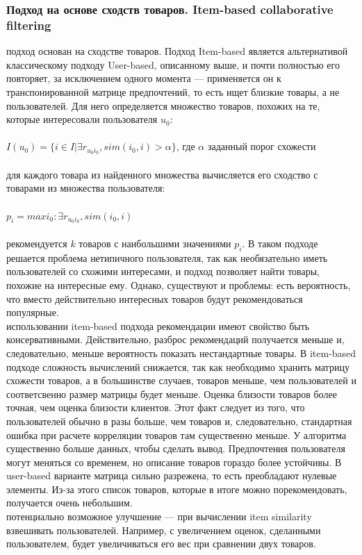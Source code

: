 \documentclass{article}
\newcommand\tab[1][1cm]{\hspace*{#1}}
\begin{document}
\subsubsection{Подход на основе сходств товаров. Item-based collaborative filtering}
 подход основан на сходстве товаров. Подход Item-based является альтернативой классическому подходу User-based, описанному выше, и почти полностью его повторяет, за исключением одного момента — применяется он к транспонированной матрице предпочтений, то есть ищет близкие товары, а не пользователей. Для него определяется множество товаров, похожих на те, которые интересовали пользователя ﻿$u_0$:\\
\\
\tab$I(u_0)=\{i\in I|\exists r_{u_0i_0}, sim(i_0,i)>\alpha \}$, где ﻿$\alpha$ заданный порог схожести\\
\\
 для каждого товара из найденного множества вычисляется его сходство с товарами из множества пользователя:\\
\\
\tab$p_i=max i_0: \exists r_{u_0i_0},sim(i_0,i)$\\
\\
 рекомендуется ﻿$k$ товаров с наибольшими значениями $p_i$﻿. В таком подходе решается проблема нетипичного пользователя, так как необязательно иметь пользователей со схожими интересами, и подход позволяет найти товары, похожие на интересные ему. Однако, существуют и проблемы: есть вероятность, что вместо действительно интересных товаров будут рекомендоваться популярные.\\
 использовании item-based подхода рекомендации имеют свойство быть консервативными. Действительно, разброс рекомендаций получается меньше и, следовательно, меньше вероятность показать нестандартные товары. В item-based подходе сложность вычислений снижается, так как необходимо хранить матрицу схожести товаров, а в большинстве случаев, товаров меньше, чем пользователей и соответсвенно размер матрицы будет меньше. Оценка близости товаров более точная, чем оценка близости клиентов. Этот факт следует из того, что пользователей обычно в разы больше, чем товаров и, следовательно, стандартная ошибка при расчете корреляции товаров там существенно меньше. У алгоритма существенно больше данных, чтобы сделать вывод. Предпочтения пользователя могут меняться со временем, но описание товаров гораздо более устойчивы. В user-based варианте матрица сильно разрежена, то есть преобладают нулевые элементы. Из-за этого список товаров, которые в итоге можно порекомендовать, получается очень небольшим.\\
 потенциально возможное улучшение — при вычислении item similarity взвешивать пользователей. Например, с увеличением оценок, сделанными пользователем, будет увеличиваться его вес при сравнении двух товаров.
\end{document}
